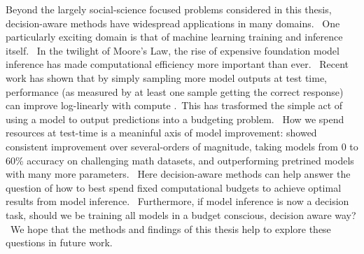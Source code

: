 Beyond the largely social-science focused problems considered in this thesis, decision-aware methods have widespread applications in many domains. \
One particularly exciting domain is that of machine learning training and inference itself. \
In the twilight of Moore's Law, the rise of expensive foundation model inference has made computational efficiency more important than ever. \
Recent work has shown that by simply sampling more model outputs at test time, performance (as measured by at least one sample getting the correct response) can improve log-linearly with compute \citep{brownLargeLanguageMonkeys2024}.\
This has trasformed the simple act of using a model to output predictions into a budgeting problem. \
How we spend resources at test-time is a meaninful axis of model improvement: \cite{muennighoffS1SimpleTesttime2025a} showed consistent improvement over several-orders of magnitude, taking models from 0 to 60\% accuracy on challenging math datasets, and outperforming pretrined models with many more parameters. \
Here decision-aware methods can help answer the question of how to best spend fixed computational budgets to achieve optimal results from model inference. \
Furthermore, if model inference is now a decision task, should we be training all models in a budget conscious, decision aware way? \
We hope that the methods and findings of this thesis help to explore these questions in future work.